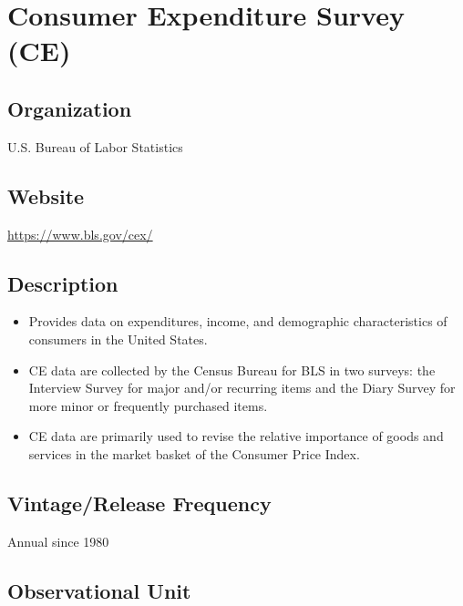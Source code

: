 \documentclass[
]{book}
\providecommand{\tightlist}{%
  \setlength{\itemsep}{0pt}\setlength{\parskip}{0pt}}
\begin{document}
\hypertarget{consumer-expenditure-survey-ce}{%
\chapter{Consumer Expenditure Survey (CE)}\label{consumer-expenditure-survey-ce}}

\hypertarget{organization-19}{%
\section{Organization}\label{organization-19}}

U.S. Bureau of Labor Statistics

\hypertarget{website-19}{%
\section{Website}\label{website-19}}

\url{https://www.bls.gov/cex/}

\hypertarget{description-19}{%
\section{Description}\label{description-19}}

\begin{itemize}
\tightlist
\item
  Provides data on expenditures, income, and demographic characteristics of consumers in the United States.
\item
  CE data are collected by the Census Bureau for BLS in two surveys: the Interview Survey for major and/or recurring items and the Diary Survey for more minor or frequently purchased items.
\item
  CE data are primarily used to revise the relative importance of goods and services in the market basket of the Consumer Price Index.
\end{itemize}

\hypertarget{vintagerelease-frequency-19}{%
\section{Vintage/Release Frequency}\label{vintagerelease-frequency-19}}

Annual since 1980

\hypertarget{observational-unit-19}{%
\section{Observational Unit}\label{observational-unit-19}}
\end{document}
